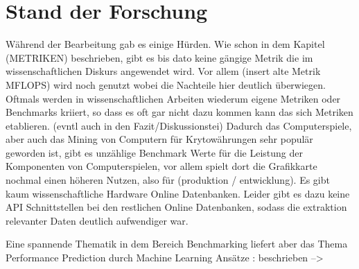 \cleardoublepage
\chapter{Stand der Forschung}

Während der Bearbeitung gab es einige Hürden.
Wie schon in dem Kapitel (METRIKEN) beschrieben, gibt es bis dato keine gängige Metrik die im wissenschaftlichen Diskurs angewendet wird. Vor allem (insert alte Metrik MFLOPS) wird noch genutzt wobei die Nachteile hier deutlich überwiegen. Oftmals werden in wissenschaftlichen Arbeiten wiederum eigene Metriken oder Benchmarks kriiert, so dass es oft gar nicht dazu kommen kann das sich Metriken etablieren.
(evntl auch in den Fazit/Diskussionstei)
Dadurch das Computerspiele, aber auch das Mining von Computern für Krytowährungen sehr populär geworden ist, gibt es unzählige Benchmark Werte für die Leistung der Komponenten von Computerspielen, vor allem spielt dort die Grafikkarte nochmal einen höheren Nutzen, also für (produktion / entwicklung).
Es gibt kaum wissenschaftliche Hardware Online Datenbanken. Leider gibt es dazu keine API Schnittstellen bei den restlichen Online Datenbanken, sodass die extraktion relevanter Daten deutlich aufwendiger war.

Eine spannende Thematik in dem Bereich Benchmarking liefert aber das Thema Performance Prediction durch Machine Learning Ansätze : beschrieben --> %
